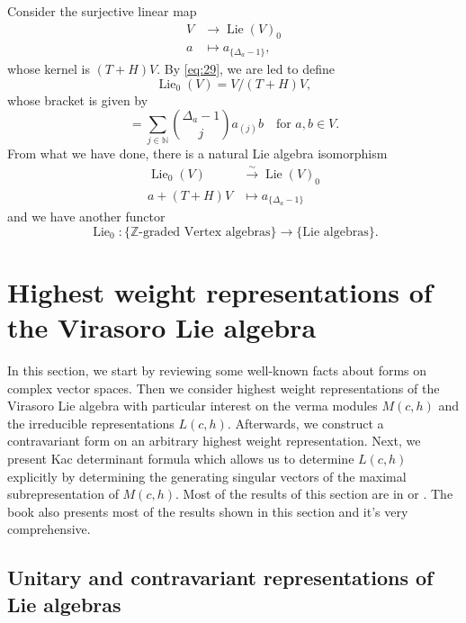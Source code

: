 \documentclass[a4paper, 12pt, reqno]{amsart}
\theoremstyle{remark}
\numberwithin{equation}{subsection}
\DeclareMathOperator{\Lie}{Lie}
\begin{document}
Consider the surjective linear map
\begin{align*}
  V &\to \Lie(V)_0 \\
  a &\mapsto a_{\{\Delta_a - 1\}},
\end{align*}
whose kernel is $(T + H)V$.
By \eqref{eq:29}, we are led to define
\begin{equation*}
  \Lie_0(V) = V/(T + H)V,
\end{equation*}
whose bracket is given by
\begin{equation*}
  [a + (T + H)V, b + (T + H)V] = \sum_{j \in \mathbb{N}}\binom{\Delta_a - 1}{j}a_{(j)}b \quad \text{for }a, b \in V.
\end{equation*}
From what we have done, there is a natural Lie algebra isomorphism
\begin{align*}
  \Lie_0(V) &\xrightarrow{\sim} \Lie(V)_0 \\
  a + (T + H)V &\mapsto a_{\{\Delta_a - 1\}}
\end{align*}
and we have another functor
\begin{equation*}
  \Lie_0: \{\text{$\mathbb{Z}$-graded Vertex algebras}\} \to \{\text{Lie algebras}\}.
\end{equation*}

\section{Highest weight representations of the Virasoro Lie algebra}
\label{sec:high-weight-repr}

In this section, we start by reviewing some well-known facts about forms on complex vector spaces.
Then we consider highest weight representations of the Virasoro Lie algebra with particular interest on the verma modules $M(c, h)$ and the irreducible representations $L(c, h)$.
Afterwards, we construct a contravariant form on an arbitrary highest weight representation.
Next, we present Kac determinant formula which allows us to determine $L(c, h)$ explicitly by determining the generating singular vectors of the maximal subrepresentation of $M(c, h)$.
Most of the results of this section are in \cite{kac_bombay_2013} or \cite{astashkevich_structure_1997}.
The book \cite{iohara_representation_2011} also presents most of the results shown in this section and it's very comprehensive.

\subsection{Unitary and contravariant representations of Lie algebras}
\label{sec:unit-contr-repr}
\end{document}
